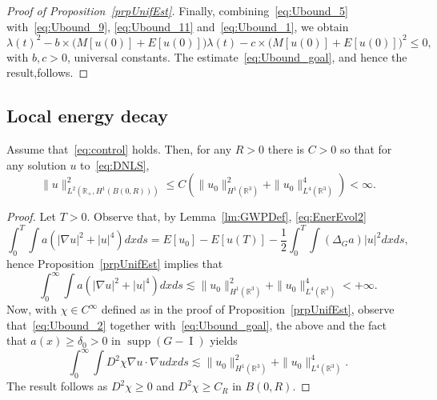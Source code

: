 \documentclass[AHL,Unicode,longabstracts,published]{cedram}
\newcommand*\R{\mathbb{R}}
\DeclareMathOperator{\I}{I}
\DeclareMathOperator{\supp}{supp}
\begin{document}
\begin{proof}[Proof of Proposition~\ref{prpUnifEst}]
Finally, combining~\eqref{eq:Ubound_5} with~\eqref{eq:Ubound_9}, \eqref{eq:Ubound_11} and~\eqref{eq:Ubound_1}, we obtain
\[
\lambda(t)^2 - b \times \bigl(M[u(0)] + E[u(0)]\bigr) \lambda(t) - c \times \bigl(M[u(0)] + E[u(0)]\bigr)^2 \leq 0,
\]
with $b, c>0$, universal constants. The estimate~\eqref{eq:Ubound_goal}, and hence the result,\linebreak follows.
\end{proof}

\subsection{Local energy decay} \label{ss:loc_dec}

\begin{coro} \label{cor:Ubound1}
Assume that~\eqref{eq:control} holds. Then, for any $R>0$ there is $C>0$ so that for any solution $u$ to~\eqref{eq:DNLS},
\begin{equation}\label{eq:L2H1LocDec}
\| u \|^2_{L^2\left(\R_+, H^1(B(0,R))\right)} \leq C\left(\| u_0 \|_{H^1(\R^3)}^2 + \| u_0 \|_{L^4(\R^3)}^4\right) < \infty.
\end{equation}
\end{coro}
\begin{proof}
Let $T>0$. Observe that, by Lemma~\ref{lm:GWPDef}, \eqref{eq:EnerEvol2}
\[
\int_0^T \int a\left(|\nabla u|^2 + |u|^{4}\right) dx ds = E[u_0] - E[u(T)] - \frac{1}{2} \int_0^T \int (\Delta_G a) |u|^2 dx ds,
\]
hence Proposition~\ref{prpUnifEst} implies that
\[
\int_0^\infty \int a\left(|\nabla u|^2 + |u|^{4}\right) dx ds
\lesssim \| u_0 \|_{H^1(\R^3)}^2 + \| u_0 \|_{L^4(\R^3)}^4 < +\infty.
\]
Now, with $\chi \in C^\infty$ defined as in the proof of Proposition~\ref{prpUnifEst}, observe that~\eqref{eq:Ubound_2} together with~\eqref{eq:Ubound_goal}, the above and the fact that $a(x) \geq \delta_0 > 0$ in $\supp(G-\I )$ yields
\[
\int_0^\infty \int D^2 \chi \nabla u \cdot \nabla u dx ds
\lesssim \| u_0 \|_{H^1(\R^3)}^2 + \| u_0 \|_{L^4(\R^3)}^4.
\]
The result follows as $D^2 \chi \geq 0$ and $D^2 \chi \geq C_R$ in $B(0,R)$.
\end{proof}
\end{document}
